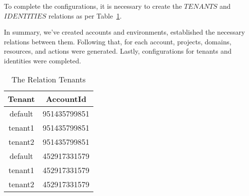 To complete the configurations, it is necessary to create the $TENANTS$ and $IDENTITIES$ relations as per Table~\ref{table:table-tenants}.

\vspace{15pt}

In summary, we've created accounts and environments, established the necessary relations between them. Following that, for each account, projects, domains, resources, and actions were generated. 
Lastly, configurations for tenants and identities were completed.

\begin{table}[h]
    \caption{The Relation Tenants}
    \label{table:table-tenants}
    \begin{center}
    \begin{tabular}{|c|c|}
    \hline
    Tenant & AccountId\\
    \hline
    default & 951435799851 \\
    \hline
    tenant1 & 951435799851 \\
    \hline
    tenant2 & 951435799851 \\
    \hline
    default & 452917331579 \\
    \hline
    tenant1 & 452917331579 \\
    \hline
    tenant2 & 452917331579 \\
    \hline
    \end{tabular}
    \end{center}
\end{table}


